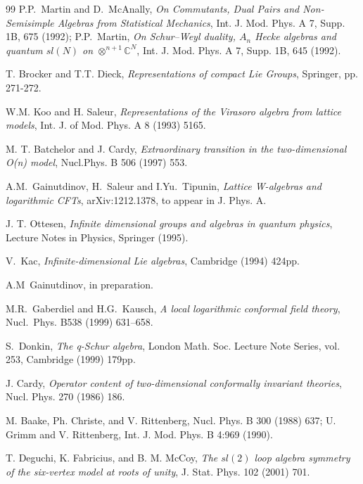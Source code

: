 \documentclass[11pt]{article}
\theoremstyle{definition}
\begin{document}
\begin{thebibliography}{99}
 P.P.~Martin and D.~McAnally, \textit{On Commutants, Dual Pairs and Non-Semisimple Algebras from Statistical Mechanics}, Int. J. Mod. Phys. A 7, Supp. 1B, 675 (1992); P.P.~Martin, \textit{On Schur--Weyl duality, $A_n$ Hecke algebras and quantum $sl(N)$ on $\otimes^{n+1}{\mathbb C}^N$}, Int. J. Mod. Phys. A 7, Supp. 1B, 645 (1992).

 T. Brocker and T.T. Dieck, \textit{Representations of compact Lie Groups}, Springer, pp. 271-272.

  W.M. Koo and H. Saleur,  \textit{Representations of
  the Virasoro algebra from lattice models}, Int. J. of Mod. Phys. A 8  (1993) 5165.

 M. T. Batchelor and J. Cardy, \textit{Extraordinary transition in the two-dimensional O(n) model}, Nucl.Phys. B 506 (1997) 553.

 A.M.~Gainutdinov, H.~Saleur and I.Yu.~Tipunin, \textit{Lattice W-algebras and logarithmic CFTs}, arXiv:1212.1378, to appear in J. Phys. A.

 J. T. Ottesen, \textit{Infinite dimensional groups and algebras in quantum physics}, Lecture Notes in Physics, Springer (1995).

 V.~Kac, \textit{Infinite-dimensional Lie algebras}, Cambridge (1994) 424pp.

 A.M~Gainutdinov, in preparation.

 M.R.~Gaberdiel and H.G.~Kausch, \textit{A
    local logarithmic conformal field theory}, Nucl.\ Phys. B538
  (1999) 631--658.

\bibitem{[Donk]} S.~Donkin, \textit{The q-Schur algebra}, London Math. Soc. Lecture
Note Series, vol. 253,  Cambridge (1999) 179pp.

 J. Cardy, \textit{Operator content of two-dimensional conformally invariant theories}, Nucl. Phys. 270 (1986) 186.

 M. Baake, Ph. Christe, and V. Rittenberg, Nucl. Phys. B 300 (1988) 637; U. Grimm and V. Rittenberg, Int. J. Mod. Phys. B 4:969 (1990).

 T. Deguchi, K. Fabricius, and B. M. McCoy, \textit{The
  $sl(2)$ loop algebra symmetry of the six-vertex model at roots of unity}, J. Stat. Phys. 102 (2001) 701.

\end{thebibliography}
\end{document}
